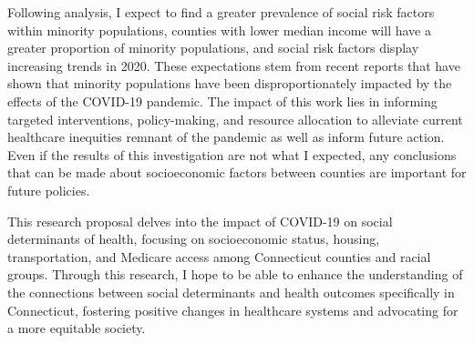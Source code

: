 \documentclass[12pt]{article}
\begin{document}
Following analysis, I expect to find a greater prevalence of social risk factors within minority populations, 
counties with lower median income will have a greater proportion of minority populations, and social risk 
factors display increasing trends in 2020. These expectations stem from recent reports that have shown that 
minority populations have been disproportionately impacted by the effects of the COVID-19 pandemic. The impact 
of this work lies in informing targeted interventions, policy-making, and resource allocation to alleviate 
current healthcare inequities remnant of the pandemic as well as inform future action. Even if the results 
of this investigation are not what I expected, any conclusions that can be made about socioeconomic factors 
between counties are important for future policies.

This research proposal delves into the impact of COVID-19 on social determinants of health, focusing on 
socioeconomic status, housing, transportation, and Medicare access among Connecticut counties and racial groups. 
Through this research, I hope to be able to enhance the understanding of the connections between social 
determinants and health outcomes specifically in Connecticut, fostering positive changes in healthcare 
systems and advocating for a more equitable society.




\end{document}
